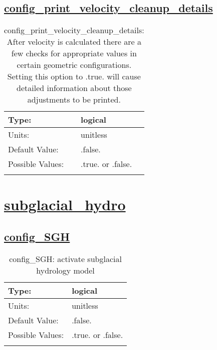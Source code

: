 \subsection[config\_print\_velocity\_cleanup\_details]{\hyperref[sec:nm_tab_debug]{config\_print\_velocity\_cleanup\_details}}
\label{subsec:nm_sec_config_print_velocity_cleanup_details}
\begin{center}
\begin{longtable}{| p{2.0in} || p{4.0in} |}
    \hline
    Type: & logical \\
    \hline
    Units: & \si{unitless} \\
    \hline
    Default Value: & .false. \\
    \hline
    Possible Values: & .true. or .false. \\
    \hline
    \caption{config\_print\_velocity\_cleanup\_details: After velocity is calculated there are a few checks for appropriate values in certain geometric configurations.  Setting this option to .true. will cause detailed information about those adjustments to be printed.}
\end{longtable}
\end{center}
\section[subglacial\_hydro]{\hyperref[sec:nm_tab_subglacial_hydro]{subglacial\_hydro}}
\label{sec:nm_sec_subglacial_hydro}
\subsection[config\_SGH]{\hyperref[sec:nm_tab_subglacial_hydro]{config\_SGH}}
\label{subsec:nm_sec_config_SGH}
\begin{center}
\begin{longtable}{| p{2.0in} || p{4.0in} |}
    \hline
    Type: & logical \\
    \hline
    Units: & \si{unitless} \\
    \hline
    Default Value: & .false. \\
    \hline
    Possible Values: & .true. or .false. \\
    \hline
    \caption{config\_SGH: activate subglacial hydrology model}
\end{longtable}
\end{center}
